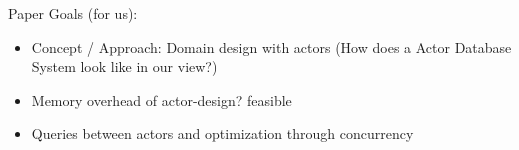 

Paper Goals (for us):
\begin{itemize}
  \item Concept / Approach: Domain design with actors (How does a Actor Database System look like in our view?)
  \item Memory overhead of actor-design? feasible
  \item Queries between actors and optimization through concurrency
\end{itemize}
        










